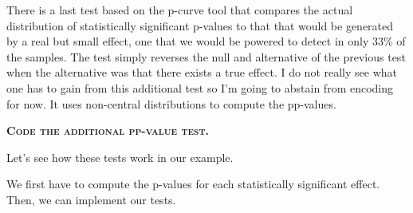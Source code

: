 \documentclass[]{book}
\theoremstyle{definition}
\theoremstyle{definition}
\theoremstyle{definition}
\theoremstyle{remark}
\let\BeginKnitrBlock\begin \let\EndKnitrBlock\end
\begin{document}
There is a last test based on the p-curve tool that compares the actual distribution of statistically significant p-values to that that would be generated by a real but small effect, one that we would be powered to detect in only 33\% of the samples.
The test simply reverses the null and alternative of the previous test when the alternative was that there exists a true effect.
I do not really see what one has to gain from this additional test so I'm going to abstain from encoding for now.
It uses non-central distributions to compute the pp-values.

\textbf{\textsc{Code the additional pp-value test.}}

\BeginKnitrBlock{example}
\protect\hypertarget{exm:unnamed-chunk-168}{}{\label{exm:unnamed-chunk-168} }Let's see how these tests work in our example.
\EndKnitrBlock{example}

We first have to compute the p-values for each statistically significant effect.
Then, we can implement our tests.
\end{document}
